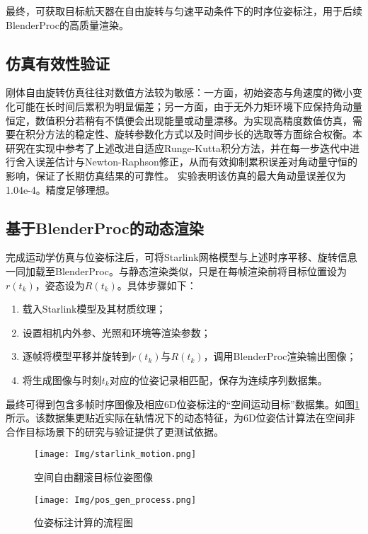 最终，可获取目标航天器在自由旋转与匀速平动条件下的时序位姿标注，用于后续BlenderProc的高质量渲染。

\subsection{仿真有效性验证}
\label{sec:simulation_validity_measure}

刚体自由旋转仿真往往对数值方法较为敏感：一方面，初始姿态与角速度的微小变化可能在长时间后累积为明显偏差；另一方面，由于无外力矩环境下应保持角动量恒定，数值积分若稍有不慎便会出现能量或动量漂移。为实现高精度数值仿真，需要在积分方法的稳定性、旋转参数化方式以及时间步长的选取等方面综合权衡。本研究在实现中参考了上述改进自适应Runge-Kutta积分方法，并在每一步迭代中进行舍入误差估计与Newton-Raphson修正，从而有效抑制累积误差对角动量守恒的影响，保证了长期仿真结果的可靠性。
实验表明该仿真的最大角动量误差仅为1.04e-4。精度足够理想。


\subsection{基于BlenderProc的动态渲染}

完成运动学仿真与位姿标注后，可将Starlink网格模型与上述时序平移、旋转信息一同加载至BlenderProc。与静态渲染类似，只是在每帧渲染前将目标位置设为$r(t_k)$，姿态设为$R(t_k)$。具体步骤如下：

\begin{enumerate}
	\item 载入Starlink模型及其材质纹理；
	\item 设置相机内外参、光照和环境等渲染参数；
	\item 逐帧将模型平移并旋转到$r(t_k)$与$R(t_k)$，调用BlenderProc渲染输出图像；
	\item 将生成图像与时刻$t_k$对应的位姿记录相匹配，保存为连续序列数据集。
\end{enumerate}

最终可得到包含多帧时序图像及相应6D位姿标注的“空间运动目标”数据集。如图\ref{fig:starlink_render_dyn}所示。该数据集更贴近实际在轨情况下的动态特征，为6D位姿估计算法在空间非合作目标场景下的研究与验证提供了更测试依据。
\begin{figure}[htbp]
	\centering
	\texttt{[image: Img/starlink\_motion.png]}
	\caption{空间自由翻滚目标位姿图像}
	\label{fig:starlink_render_dyn}
	\vspace{-3ex}
\end{figure}

\begin{figure}[htbp]
	\centering
	\texttt{[image: Img/pos\_gen\_process.png]}
	\caption{位姿标注计算的流程图}
	\label{fig:pos_gen_process}
	\vspace{-3ex}
\end{figure}

